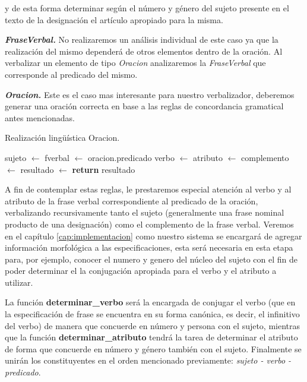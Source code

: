 \noindent
y de esta forma determinar según el número y género del sujeto presente en el texto de la designación el artículo apropiado para la misma.

\medskip
\noindent
\textbf{\emph{FraseVerbal.}} No realizaremos un análisis individual de este caso ya que la realización del mismo dependerá de otros elementos dentro de la oración. Al verbalizar un elemento de tipo \emph{Oracion} analizaremos la \emph{FraseVerbal} que corresponde al predicado del mismo.


\medskip
\noindent
\textbf{\emph{Oracion.}} Este es el caso mas interesante para nuestro verbalizador, deberemos generar una oración correcta en base a las reglas de concordancia gramatical antes mencionadas. 

\begin{algorithm}[H]
\caption{Realización lingüística Oracion.}
\begin{algorithmic}[1]
\State sujeto $\gets$ 
\State fverbal $\gets$ oracion.predicado
\State verbo $\gets$ 
\State atributo $\gets$ 
\State complemento $\gets$ 
\Statex
\State resultado $\gets$ 
\Statex
\State \textbf{return} resultado
\EndFunction
\end{algorithmic}
\end{algorithm}

\noindent
A fin de contemplar estas reglas, le prestaremos especial atención al verbo y al atributo de la frase verbal correspondiente al predicado de la oración, verbalizando recursivamente tanto el sujeto (generalmente una frase nominal producto de una designación) como el complemento de la frase verbal. Veremos en el capítulo \ref{cap:implementacion} como nuestro sistema se encargará de agregar información morfológica a las especificaciones, esta será necesaria en esta etapa para, por ejemplo, conocer el numero y genero del núcleo del sujeto con el fin de poder determinar el la conjugación apropiada para el verbo y el atributo a utilizar.

La función \textbf{determinar\_verbo} será la encargada de conjugar el verbo (que en la especificación de frase se encuentra en su forma canónica, es decir, el infinitivo del verbo) de manera que concuerde en número y persona con el sujeto, mientras que la función \textbf{determinar\_atributo} tendrá la tarea de determinar el atributo de forma que concuerde en número y género también con el sujeto. Finalmente se unirán los constituyentes en el orden mencionado previamente: \emph{sujeto - verbo - predicado}.

